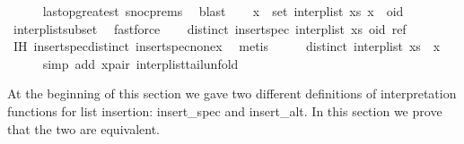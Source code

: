 \begin{isabellebody}
\ \ \ \ \isamarkupfalse%
\ last{\isacharunderscore}op{\isacharunderscore}greatest\ snoc{\isachardot}prems\ \isamarkupfalse%
\ blast\isanewline
\ \ \isamarkupfalse%
\ {\isachardoublequoteopen}{\isasymforall}x\ {\isasymin}\ set\ {\isacharparenleft}interp{\isacharunderscore}list\ xs{\isacharparenright}{\isachardot}\ x\ {\isacharless}\ oid{\isachardoublequoteclose}\isanewline
\ \ \ \ \isamarkupfalse%
\ interp{\isacharunderscore}list{\isacharunderscore}subset\ \isamarkupfalse%
\ fastforce\isanewline
\ \ \isamarkupfalse%
\ {\isachardoublequoteopen}distinct\ {\isacharparenleft}insert{\isacharunderscore}spec\ {\isacharparenleft}interp{\isacharunderscore}list\ xs{\isacharparenright}\ {\isacharparenleft}oid{\isacharcomma}\ ref{\isacharparenright}{\isacharparenright}{\isachardoublequoteclose}\isanewline
\ \ \ \ \isamarkupfalse%
\ IH\ insert{\isacharunderscore}spec{\isacharunderscore}distinct\ insert{\isacharunderscore}spec{\isacharunderscore}nonex\ \isamarkupfalse%
\ metis\isanewline
\ \ \isamarkupfalse%
\ \isamarkupfalse%
\ {\isachardoublequoteopen}distinct\ {\isacharparenleft}interp{\isacharunderscore}list\ {\isacharparenleft}xs\ {\isacharat}\ {\isacharbrackleft}x{\isacharbrackright}{\isacharparenright}{\isacharparenright}{\isachardoublequoteclose}\isanewline
\ \ \ \ \isamarkupfalse%
\ {\isacharparenleft}simp\ add{\isacharcolon}\ x{\isacharunderscore}pair\ interp{\isacharunderscore}list{\isacharunderscore}tail{\isacharunderscore}unfold{\isacharparenright}\isanewline
{}\isamarkupfalse%
%
\endisatagproof
{\isafoldproof}%
%
\isadelimproof
%
\endisadelimproof
%
\isamarkuptrue%
%
\begin{isamarkuptext}%
At the beginning of this section we gave two different definitions of
interpretation functions for list insertion: insert\_spec and insert\_alt.
In this section we prove that the two are equivalent.


\end{isamarkuptext}
\end{isabellebody}
